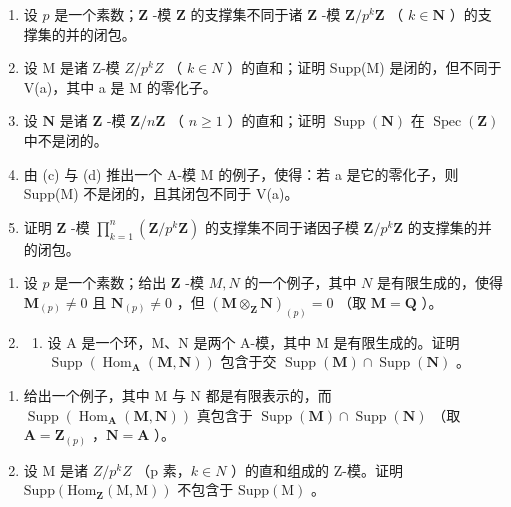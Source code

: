 \begin{enumerate}
\def\labelenumi{(\alph{enumi})}
\setcounter{enumi}{1}
\item
  设 \(p\) 是一个素数；\(\mathbf{Z}\) -模 \(\mathbf{Z}\) 的支撑集不同于诸 \(\mathbf{Z}\) -模 \(\mathbf{Z} / p^k\mathbf{Z}\) （ \(k \in \mathbf{N}\) ）的支撑集的并的闭包。
\item
  设 M 是诸 Z-模 \(Z/p^{k}Z\) （ \(k \in N\) ）的直和；证明 Supp(M) 是闭的，但不同于 V(a)，其中 a 是 M 的零化子。
\item
  设 \(\mathbf{N}\) 是诸 \(\mathbf{Z}\) -模 \(\mathbf{Z} / n\mathbf{Z}\) （ \(n \geqslant 1\) ）的直和；证明 \(\operatorname{Supp}(\mathbf{N})\) 在 \(\operatorname{Spec}(\mathbf{Z})\) 中不是闭的。
\item
  由 (c) 与 (d) 推出一个 A-模 M 的例子，使得：若 a 是它的零化子，则 Supp(M) 不是闭的，且其闭包不同于 V(a)。
\item
  证明 \(\mathbf{Z}\) -模 \(\prod_{k=1}^{n} (\mathbf{Z}/p^k\mathbf{Z})\) 的支撑集不同于诸因子模 \(\mathbf{Z}/p^k\mathbf{Z}\) 的支撑集的并的闭包。
\end{enumerate}

\begin{enumerate}
\def\labelenumi{\arabic{enumi}.}
\setcounter{enumi}{22}
\item
  设 \(p\) 是一个素数；给出 \(\mathbf{Z}\) -模 \(M, N\) 的一个例子，其中 \(N\) 是有限生成的，使得 \(\mathbf{M}_{(p)} \neq 0\) 且 \(\mathbf{N}_{(p)} \neq 0\) ，但 \((\mathbf{M} \otimes_{\mathbf{Z}} \mathbf{N})_{(p)} = 0\) （取 \(\mathbf{M} = \mathbf{Q}\) ）。
\item
  \begin{enumerate}
  \def\labelenumii{(\alph{enumii})}
  \tightlist
  \item
    设 A 是一个环，M、N 是两个 A-模，其中 M 是有限生成的。证明 \(\operatorname{Supp}(\operatorname{Hom}_{\mathbf{A}}(\mathbf{M}, \mathbf{N}))\) 包含于交 \(\operatorname{Supp}(\mathbf{M}) \cap \operatorname{Supp}(\mathbf{N})\) 。
  \end{enumerate}
\end{enumerate}

\begin{enumerate}
\def\labelenumi{(\alph{enumi})}
\setcounter{enumi}{1}
\item
  给出一个例子，其中 M 与 N 都是有限表示的，而 \(\operatorname{Supp}(\operatorname{Hom}_{\mathbf{A}}(\mathbf{M},\mathbf{N}))\) 真包含于 \(\operatorname{Supp}(\mathbf{M}) \cap \operatorname{Supp}(\mathbf{N})\) （取 \(\mathbf{A} = \mathbf{Z}_{(p)}\) ，\(\mathbf{N} = \mathbf{A}\) ）。
\item
  设 M 是诸 \(Z/p^{k}Z\) （p 素，\(k \in N\) ）的直和组成的 Z-模。证明 \(\text{Supp}(\text{Hom}_{\mathbf{Z}}(\text{M}, \text{M}))\) 不包含于 \(\text{Supp}(\text{M})\) 。
\end{enumerate}

